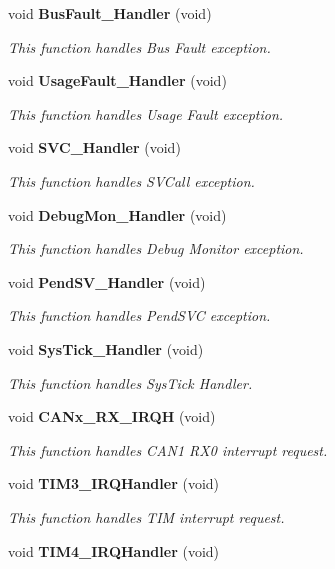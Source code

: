 \begin{DoxyCompactItemize}
void \textbf{ Bus\+Fault\+\_\+\+Handler} (void)
\begin{DoxyCompactList}\small\item\em This function handles Bus Fault exception. \end{DoxyCompactList}\item 
void \textbf{ Usage\+Fault\+\_\+\+Handler} (void)
\begin{DoxyCompactList}\small\item\em This function handles Usage Fault exception. \end{DoxyCompactList}\item 
void \textbf{ S\+V\+C\+\_\+\+Handler} (void)
\begin{DoxyCompactList}\small\item\em This function handles S\+V\+Call exception. \end{DoxyCompactList}\item 
void \textbf{ Debug\+Mon\+\_\+\+Handler} (void)
\begin{DoxyCompactList}\small\item\em This function handles Debug Monitor exception. \end{DoxyCompactList}\item 
void \textbf{ Pend\+S\+V\+\_\+\+Handler} (void)
\begin{DoxyCompactList}\small\item\em This function handles Pend\+S\+VC exception. \end{DoxyCompactList}\item 
void \textbf{ Sys\+Tick\+\_\+\+Handler} (void)
\begin{DoxyCompactList}\small\item\em This function handles Sys\+Tick Handler. \end{DoxyCompactList}\item 
void \textbf{ C\+A\+Nx\+\_\+\+R\+X\+\_\+\+I\+R\+QH} (void)
\begin{DoxyCompactList}\small\item\em This function handles C\+A\+N1 R\+X0 interrupt request. \end{DoxyCompactList}\item 
void \textbf{ T\+I\+M3\+\_\+\+I\+R\+Q\+Handler} (void)
\begin{DoxyCompactList}\small\item\em This function handles T\+IM interrupt request. \end{DoxyCompactList}\item 
void \textbf{ T\+I\+M4\+\_\+\+I\+R\+Q\+Handler} (void)

\end{DoxyCompactItemize}
